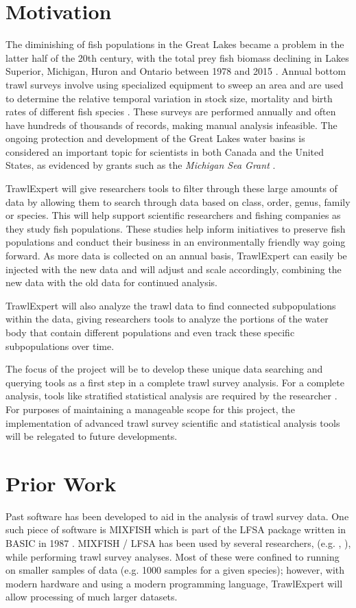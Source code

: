 \documentclass{article}
\begin{document}
\section{Motivation}
The diminishing of fish populations in the Great Lakes became a problem in the latter half of the 20th century, with the total prey fish biomass declining in Lakes Superior, Michigan, Huron and Ontario between 1978 and 2015 \citep{michigan2017}. Annual bottom trawl surveys involve using specialized equipment to sweep an area and are used to determine the relative temporal variation in stock size, mortality and birth rates of different fish species \citep{walsh1997efficiency}. These surveys are performed annually and often have hundreds of thousands of records, making manual analysis infeasible. The ongoing protection and development of the Great Lakes water basins is considered an important topic for scientists in both Canada and the United States, as evidenced by grants such as the \textit{Michigan Sea Grant} \citep{michseagr2018}.

TrawlExpert will give researchers tools to filter through these large amounts of data by allowing them to search through data based on class, order, genus, family or species. This will help support scientific researchers and fishing companies as they study fish populations. These studies help inform initiatives to preserve fish populations and conduct their business in an environmentally friendly way going forward. As more data is collected on an annual basis, TrawlExpert can easily be injected with the new data and will adjust and scale accordingly, combining the new data with the old data for continued analysis.

TrawlExpert will also analyze the trawl data to find connected subpopulations within the data, giving researchers tools to analyze the portions of the water body that contain different populations and even track these specific subpopulations over time.

The focus of the project will be to develop these unique data searching and querying tools as a first step in a complete trawl survey analysis. For a complete analysis, tools like stratified statistical analysis are required by the researcher \citep{walsh1997efficiency}. For purposes of maintaining a manageable scope for this project, the implementation of advanced trawl survey scientific and statistical analysis tools will be relegated to future developments. 

\section{Prior Work}
Past software has been developed to aid in the analysis of trawl survey data. One such piece of software is MIXFISH which is part of the LFSA package written in BASIC in 1987 \citep{sparre1987computer}. MIXFISH / LFSA has been used by several researchers, (e.g. \citeauthor{levi1993analysis}, \citeauthor{chakraborty1996stock}), while performing trawl survey analyses. Most of these were confined to running on smaller samples of data (e.g. 1000 samples for a given species); however, with modern hardware and using a modern programming language, TrawlExpert will allow processing of much larger datasets.
\end{document}
